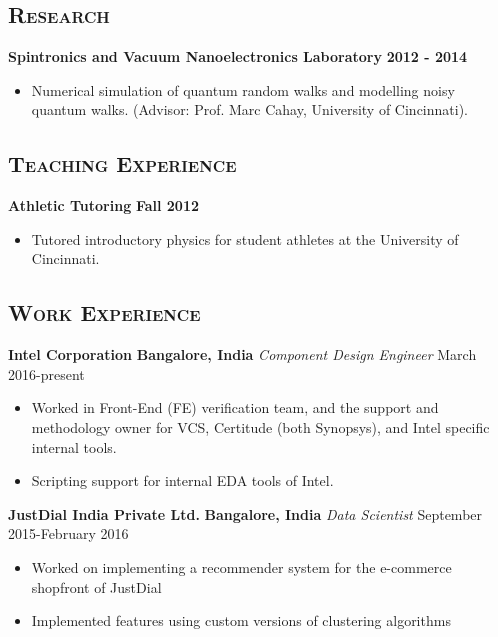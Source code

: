 \documentclass[10pt]{article}
\begin{document}

\subsection*{\textsc{\large Research}}
\textbf{Spintronics and Vacuum Nanoelectronics Laboratory} \hfill \textbf{2012 - 2014}
\begin{itemize}
\item Numerical simulation of quantum random walks and modelling noisy quantum walks. (Advisor: Prof. Marc Cahay, University of Cincinnati).
\end{itemize}

\subsection*{\textsc{\large Teaching Experience}}
\textbf{Athletic Tutoring} \hfill \textbf{Fall 2012}
\begin{itemize}
\item Tutored introductory physics for student athletes at the University of Cincinnati.
\end{itemize}

\subsection*{\textsc{\large Work Experience}}
\noindent \textbf{Intel Corporation} \hfill \textbf{Bangalore, India} \newline
\textit{Component Design Engineer} \hfill March 2016-present
\begin{itemize}
\item Worked in Front-End (FE) verification team, and the support and methodology owner for VCS, Certitude (both Synopsys), and Intel specific internal tools.
\item Scripting support for internal EDA tools of Intel.
\end{itemize}

\noindent \textbf{JustDial India Private Ltd.} \hfill \textbf{Bangalore, India} \newline
\textit{Data Scientist} \hfill September 2015-February 2016
\begin{itemize}
\item Worked on implementing a recommender system for the e-commerce shopfront of JustDial
\item Implemented features using custom versions of clustering algorithms
\end{itemize}
\end{document}
